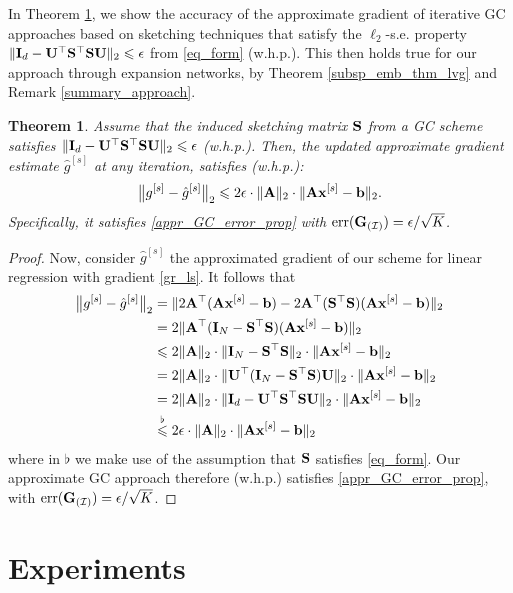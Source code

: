 \documentclass[journal,letterpaper,onecolumn,twoside,nofonttune]{IEEEtran}
\newcommand{\N}{\mathbb{N}}
\newcommand{\R}{\mathbb{R}}
\newcommand{\I}{\mathcal{I}}
\newcommand{\bb}{\bold{b}}
\newcommand{\Ub}{\bold{U}}
\newcommand{\xb}{\bold{x}}
\newcommand{\Ab}{\bold{A}}
\newcommand{\Gb}{\bold{G}}
\newcommand{\Ib}{\bold{I}}
\newcommand{\Sb}{\bold{S}}
\newcommand{\gh}{\hat{g}}
\newcommand{\err}{\mathrm{err}}
\newtheorem{Thm}{Theorem}
\begin{document}
In Theorem \ref{app_GC_thm}, we show the accuracy of the approximate gradient of iterative GC approaches based on sketching techniques that satisfy the $\ell_2$-s.e. property $\|\Ib_d-\Ub^\top\Sb^\top\Sb\Ub\|_2\leqslant\epsilon$ from \eqref{eq_form} (w.h.p.). This then holds true for our approach through expansion networks, by Theorem \ref{subsp_emb_thm_lvg} and Remark \ref{summary_approach}.

\begin{Thm}
\label{app_GC_thm}
Assume that the induced sketching matrix $\Sb$ from a GC scheme satisfies $\|\Ib_d-\Ub^\top\Sb^\top\Sb\Ub\|_2\leqslant\epsilon$ (w.h.p.). Then, the updated approximate gradient estimate $\gh^{[s]}$ at any iteration, satisfies (w.h.p.):
\begin{equation}
\label{appr_GC_error}
  \big\|g^{[s]}-\gh^{[s]}\big\|_2 \leqslant 2\epsilon\cdot\|\Ab\|_2\cdot\|\Ab\xb^{[s]}-\bb\|_2.
\end{equation}
Specifically, it satisfies \eqref{appr_GC_error_prop} with $\err(\Gb_{(\I)})=\epsilon/\sqrt{K}$.
\end{Thm}

\begin{proof}
Now, consider $\gh^{[s]}$ the approximated gradient of our scheme for linear regression with gradient \eqref{gr_ls}. It follows that
\begin{align*}
  \big\|g^{[s]}-\gh^{[s]}\big\|_2 &= \|2\Ab^\top(\Ab\xb^{[s]}-\bb)-2\Ab^\top(\Sb^\top\Sb)(\Ab\xb^{[s]}-\bb)\|_2 \\
  &= 2\|\Ab^\top(\Ib_N-\Sb^\top\Sb)(\Ab\xb^{[s]}-\bb)\|_2\\
  &\leqslant 2\|\Ab\|_2\cdot\|\Ib_N-\Sb^\top\Sb\|_2\cdot\|\Ab\xb^{[s]}-\bb\|_2\\
  &= 2\|\Ab\|_2\cdot\|\Ub^\top(\Ib_N-\Sb^\top\Sb)\Ub\|_2\cdot\|\Ab\xb^{[s]}-\bb\|_2\\
  &= 2\|\Ab\|_2\cdot\|\Ib_d-\Ub^\top\Sb^\top\Sb\Ub\|_2\cdot\|\Ab\xb^{[s]}-\bb\|_2\\
  &\overset{\flat}{\leqslant} 2\epsilon\cdot\|\Ab\|_2\cdot\|\Ab\xb^{[s]}-\bb\|_2
\end{align*}
where in $\flat$ we make use of the assumption that $\Sb$ satisfies \eqref{eq_form}. Our approximate GC approach therefore (w.h.p.) satisfies \eqref{appr_GC_error_prop}, with $\err(\Gb_{(\I)})=\epsilon/\sqrt{K}$.
\end{proof}

\section{Experiments}
\label{exper_sec}
\end{document}
